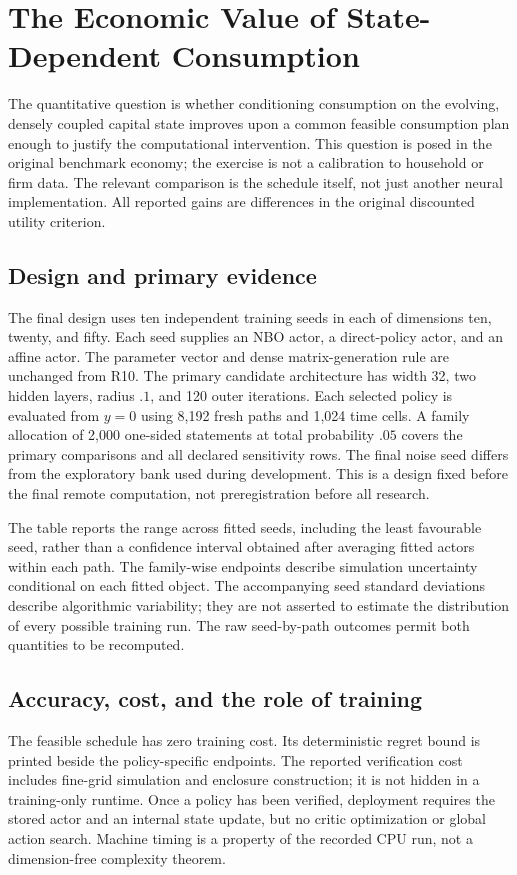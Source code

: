 \section{The Economic Value of State-Dependent Consumption}\label{sec:r11study}
The quantitative question is whether conditioning consumption on the evolving, densely coupled capital state improves upon a common feasible consumption plan enough to justify the computational intervention. This question is posed in the original benchmark economy; the exercise is not a calibration to household or firm data. The relevant comparison is the schedule itself, not just another neural implementation. All reported gains are differences in the original discounted utility criterion.

\subsection{Design and primary evidence}
The final design uses ten independent training seeds in each of dimensions ten, twenty, and fifty. Each seed supplies an NBO actor, a direct-policy actor, and an affine actor. The parameter vector and dense matrix-generation rule are unchanged from R10. The primary candidate architecture has width 32, two hidden layers, radius $.1$, and 120 outer iterations. Each selected policy is evaluated from $y=0$ using 8,192 fresh paths and 1,024 time cells. A family allocation of 2,000 one-sided statements at total probability $.05$ covers the primary comparisons and all declared sensitivity rows. The final noise seed differs from the exploratory bank used during development. This is a design fixed before the final remote computation, not preregistration before all research.




The table reports the range across fitted seeds, including the least favourable seed, rather than a confidence interval obtained after averaging fitted actors within each path. The family-wise endpoints describe simulation uncertainty conditional on each fitted object. The accompanying seed standard deviations describe algorithmic variability; they are not asserted to estimate the distribution of every possible training run. The raw seed-by-path outcomes permit both quantities to be recomputed.

\subsection{Accuracy, cost, and the role of training}


The feasible schedule has zero training cost. Its deterministic regret bound is printed beside the policy-specific endpoints. The reported verification cost includes fine-grid simulation and enclosure construction; it is not hidden in a training-only runtime. Once a policy has been verified, deployment requires the stored actor and an internal state update, but no critic optimization or global action search. Machine timing is a property of the recorded CPU run, not a dimension-free complexity theorem.

